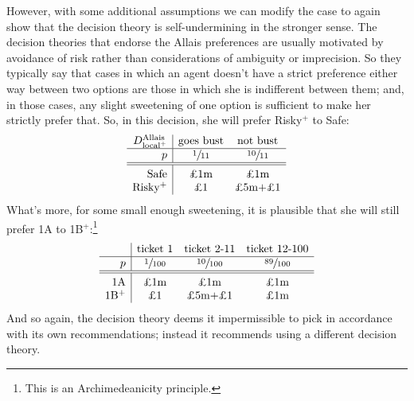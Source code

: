 \documentclass[a4paper]{article}
\newcommand\Tstrut{\rule{0pt}{2.6ex}}       %
\newcommand\Bstrut{\rule[-0.9ex]{0pt}{0pt}} %
\newenvironment{CCM rewritten}
{\begingroup\color{blue}} %
{\endgroup}              %
\begin{document}

However, with some additional assumptions we can modify the case to again show that the decision theory is self-undermining in the stronger sense. 
The decision theories that endorse the Allais preferences are usually motivated by avoidance of risk rather than considerations of ambiguity or imprecision. So they typically say that cases in which an agent doesn't have a strict preference either way between two options are those in which  she is indifferent between them; and, in those cases, any slight sweetening of one option is sufficient to make her strictly prefer  that. %
So, in this decision, she will prefer Risky$^+$ to Safe:
$$
\begin{array}{r|cc}
 D^{\mathrm{Allais}}_{\mathrm{local}^+} & \text{goes bust} &  \text{not bust}  \Bstrut\\\hline
	p & \sfrac{1}{11} & \sfrac{10}{11}\Bstrut\\\hline\hline\Tstrut
	\text{Safe} &\text{\pounds 1m}&\text{\pounds 1m}                      \\
	\text{Risky$^+$} & \text{\pounds 1}&\text{\pounds 5m+\pounds 1}
\end{array}
$$ What's more, for some small enough sweetening, it is plausible that she will still prefer 1A to 1B$^+$:\footnote{This is an Archimedeanicity principle.}
$$
\begin{array}{r|cccc}
	& \text{ticket 1} &\text{ticket 2-11}& \text{ticket 12-100}\Bstrut\\\hline
	p & \sfrac{1}{100} & \sfrac{10}{100} & \sfrac{89}{100} \Bstrut\\\hline\hline\Tstrut
	\text{1A} & \text{\pounds 1m} & \text{\pounds 1m}  & \text{\pounds 1m} \\
	\text{1B$^+$} & \text{\pounds 1} & \text{\pounds 5m+\pounds1}  & \text{\pounds 1m}
\end{array}
$$
And so again, the decision theory deems it impermissible to pick in accordance with its own recommendations; instead it recommends using a different decision theory. 
\end{document}
